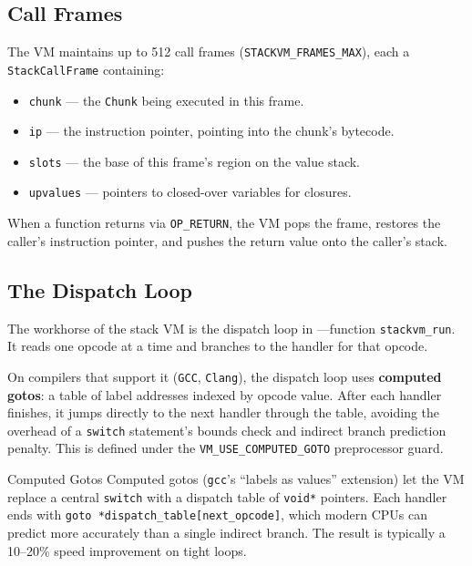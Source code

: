 \subsection{Call Frames}

The VM maintains up to 512 call frames (\lstinline|STACKVM_FRAMES_MAX|), each
a \lstinline|StackCallFrame| containing:

\begin{itemize}
  \item \lstinline|chunk| --- the \lstinline|Chunk| being executed in this
        frame.
  \item \lstinline|ip| --- the instruction pointer, pointing into the chunk's
        bytecode.
  \item \lstinline|slots| --- the base of this frame's region on the value
        stack.
  \item \lstinline|upvalues| --- pointers to closed-over variables for
        closures.
\end{itemize}

When a function returns via \lstinline|OP_RETURN|, the VM pops the frame,
restores the caller's instruction pointer, and pushes the return value onto
the caller's stack.

\subsection{The Dispatch Loop}\label{subsec:stack-dispatch}

The workhorse of the stack VM is the dispatch loop in
---function \lstinline|stackvm_run|. It reads one
opcode at a time and branches to the handler for that opcode.

On compilers that support it (\texttt{GCC}, \texttt{Clang}), the dispatch loop
uses \textbf{computed gotos}: a table of label addresses indexed by opcode value.
After each handler finishes, it jumps directly to the next handler through the
table, avoiding the overhead of a \lstinline|switch| statement's bounds check
and indirect branch prediction penalty. This is defined under the
\lstinline|VM_USE_COMPUTED_GOTO| preprocessor guard.

\begin{notebox}{Computed Gotos}
Computed gotos (\texttt{gcc}'s ``labels as values'' extension) let the VM
replace a central \lstinline|switch| with a dispatch table of
\lstinline|void*| pointers. Each handler ends with
\lstinline|goto *dispatch_table[next_opcode]|, which modern CPUs can predict
more accurately than a single indirect branch. The result is typically a
10--20\% speed improvement on tight loops.
\end{notebox}

